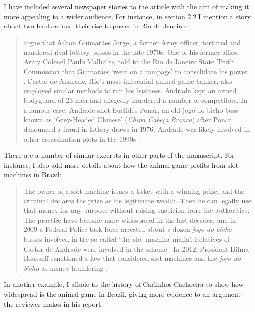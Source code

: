 \documentclass[a4paper,12pt]{article}
\begin{document}
\vspace{.25cm}

I have included several newspaper stories to the article with the aim of making it more appealing to a wider audience. For instance, in section 2.2 I mention a story about two bankers and their rise to power in Rio de Janeiro:

\begin{quote}
	\citet{jupiara2015poroes} argue that Ailton Guimarães Jorge, a former Army officer, tortured and murdered rival lottery bosses in the late 1970s. One of his former allies, Army Colonel Paulo Malha ̃es, told to the Rio de Janeiro State Truth Commission that Guimarães `went on a rampage' to consolidate his power \citep{belem2015guimaraes}. Castor de Andrade, Rio's most influential animal game banker, also employed similar methods to run his business. Andrade kept an armed bodyguard of 23 men and allegedly murdered a number of competitors. In a famous case, Andrade shot Euclides Ponar, an old jogo do bicho boss known as `Grey-Headed Chinese' (\textit{China Cabeça Branca}) after Ponar denounced a fraud in lottery draws in 1976. Andrade was likely involved in other assassination plots in the 1990s \citep{globo2017castor}.
\end{quote}

There are a number of similar excerpts in other parts of the manuscript. For instance, I also add more details about how the animal game profits from slot machines in Brazil: 

\begin{quote}
	The owner of a slot machine issues a ticket with a winning prize, and the criminal declares the prize as his legitimate wealth. Then he can legally use that money for any purpose without raising suspicion from the authorities. The practice have become more widespread in the last decades, and in 2009 a Federal Police task force arrested about a dozen \textit{jogo do bicho} bosses involved in the so-called `the slot machine mafia'. Relatives of Castor de Andrade were involved in the scheme \citep{estado2011cacaniquel}. In 2012, President Dilma Rousseff sanctioned a law that considered slot machines and the \textit{jogo do bicho} as money laundering \citep{agenciabrasil2012dilma}.
\end{quote}

In another example, I allude to the history of Carlinhos Cachoeira to show how widespread is the animal game in Brazil, giving more evidence to an argument the reviewer makes in his report.
\end{document}
